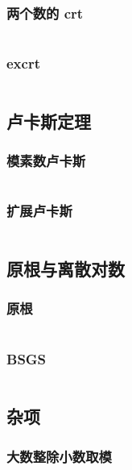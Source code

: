 \documentclass[a4paper, twoside]{article}
\begin{document}
\begin{multicols}{2}
				\subsubsection{两个数的 crt}
					\inputminted{cpp}{../src-midori/number/两个数的crt.cpp}
				\subsubsection{excrt}
					\inputminted{cpp}{../src-midori/number/excrt.cpp}
			
			\subsection{卢卡斯定理}
				\subsubsection{模素数卢卡斯}
					\inputminted{cpp}{../src-midori/number/lucas.cpp}
				\subsubsection{扩展卢卡斯}
					\inputminted{cpp}{../src-midori/number/exlucas.cpp}
			
			\subsection{原根与离散对数}
				\subsubsection{原根}
					\inputminted{cpp}{../src-midori/number/原根.cpp}
				\subsubsection{BSGS}
					\inputminted{cpp}{../src-midori/number/bsgs.cpp}
			

			\subsection{杂项}
				\subsubsection{大数整除小数取模}
					

\end{multicols}
\end{document}
